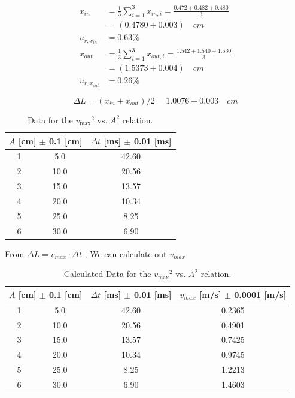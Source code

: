\[
\begin{split}
	x_{in}  & = \frac{1}{3}\sum_{i=1}^{3}x_{in,i}    
		      = \frac{0.472 + 0.482 + 0.480}{3}      \\
	        & = (0.4780 \pm 0.003) \quad cm          \\
	u_{r,x_{in}} & = 0.63 \%                         \\
	x_{out} & = \frac{1}{3}\sum_{i=1}^{3}x_{out,i}   
	          = \frac{1.542 + 1.540 + 1.530}{3}      \\
	        & = (1.5373 \pm 0.004) \quad cm          \\
	u_{r,x_{out}}& = 0.26  \%                       
\end{split}
\]

$$ \Delta L = (x_{in} + x_{out})/2 = 1.0076 \pm 0.003 \quad cm $$

\begin{table}[H]
	\centering
	\begin{tabular}{|c|c|c|}
	\hline
	\multicolumn{2}{|c|}{ $A$ [cm] $\pm$ 0.1 [cm]} & $\Delta t$ [ms] $\pm$ 0.01 [ms]    \\ \hline
	1  &  5.0 & 42.60 \\ \hline
	2  & 10.0 & 20.56 \\ \hline
	3  & 15.0 & 13.57 \\ \hline
	4  & 20.0 & 10.34 \\ \hline
	5  & 25.0 &  8.25 \\ \hline
	6  & 30.0 &  6.90 \\ \hline
	\end{tabular}
	\caption{Data for the $ {v_{\max}}^2$ vs. $A^2$ relation.}
\label{A_t}
\end{table}

From $ \Delta L = v_{max} \cdot \Delta t $ ,
We can calculate out $ v_{max} $

\begin{table}[H]
	\centering
	\begin{tabular}{|c|c|c|c|}
	\hline
	\multicolumn{2}{|c|}{$A$ [cm] $\pm$ 0.1 [cm]} 
	& $\Delta t$ [ms] $\pm$ 0.01 [ms]  
	& $v_{max}$ [m/s] $\pm$ 0.0001 [m/s] \\ \hline
	1  &  5.0 & 42.60  & 0.2365 \\ \hline
	2  & 10.0 & 20.56  & 0.4901 \\ \hline
	3  & 15.0 & 13.57  & 0.7425 \\ \hline
	4  & 20.0 & 10.34  & 0.9745 \\ \hline
	5  & 25.0 &  8.25  & 1.2213 \\ \hline
	6  & 30.0 &  6.90  & 1.4603 \\ \hline
	\end{tabular}
	\caption{Calculated Data for the $ {v_{\max}}^2$ vs. $A^2$ relation.}
\label{A_t_v}
\end{table}

